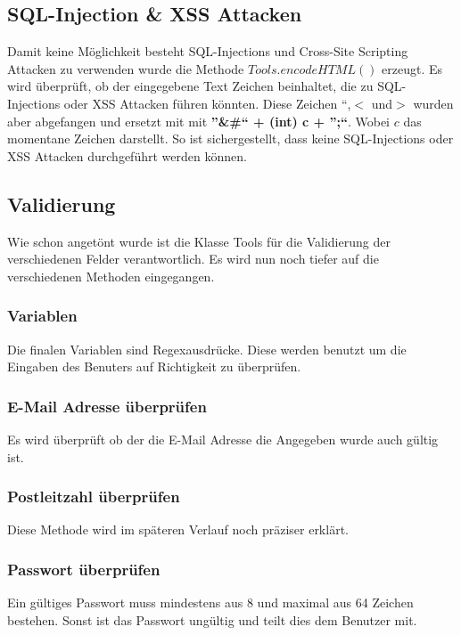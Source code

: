\documentclass[10pt]{article}
\newcommand{\Bold}[1]{\textbf{#1}} %
\begin{document}
\subsection{SQL-Injection \& XSS Attacken}
Damit keine Möglichkeit besteht SQL-Injections und Cross-Site Scripting Attacken zu verwenden wurde die Methode $Tools.encodeHTML()$ erzeugt. Es wird überprüft, ob der eingegebene Text Zeichen beinhaltet, die zu SQL-Injections oder XSS Attacken führen könnten. Diese Zeichen ``,$<$ und$>$ wurden aber abgefangen und ersetzt mit mit \Bold{''\&\#`` + (int) c + '';``}. Wobei $c$ das momentane Zeichen darstellt. So ist sichergestellt, dass keine SQL-Injections oder XSS Attacken durchgeführt werden können.

\subsection{Validierung}
Wie schon angetönt wurde ist die Klasse Tools für die Validierung der verschiedenen Felder verantwortlich. Es wird nun noch tiefer auf die verschiedenen Methoden eingegangen.
\subsubsection{Variablen}
Die finalen Variablen sind Regexausdrücke. Diese werden benutzt um die Eingaben des Benuters auf Richtigkeit zu überprüfen.

\subsubsection{E-Mail Adresse überprüfen}
Es wird überprüft ob der die E-Mail Adresse die Angegeben wurde auch gültig ist.

\subsubsection{Postleitzahl überprüfen}
Diese Methode wird im späteren Verlauf noch präziser erklärt.
\subsubsection{Passwort überprüfen}
Ein gültiges Passwort muss mindestens aus 8 und maximal aus 64 Zeichen bestehen. Sonst ist das Passwort ungültig und teilt dies dem Benutzer mit.

\end{document}
